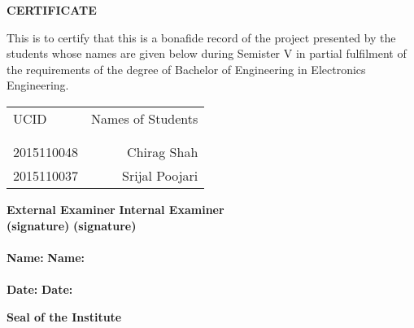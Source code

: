 \newpage
\thispagestyle{empty}
\vspace*{0.2cm}
\vspace{1cm}
\begin{center}
 \large\textbf{CERTIFICATE }
\end{center}%
\vspace{2cm}
This is to certify that this is a bonafide record of the project presented by the students whose names are given below during Semister V in partial fulfilment of the requirements of the degree of Bachelor of Engineering in Electronics Engineering.

\begin{table}[h]
\centering
\begin{tabular}{lr}
UCID & Names of Students \\ \\ \hline
\\
2015110048 &  Chirag Shah \\
2015110037 &  Srijal Poojari \\ 
 \hline 
\end{tabular}
\end{table}

\vspace{2.5cm}
\textbf {External Examiner} \hspace{2.8in} \textbf{Internal Examiner}
\vspace{2cm}\\
\textbf {(signature)} \hspace{3.5in} \textbf{(signature)} \\
\vspace{1cm}\\
\textbf {Name:} \hspace{3in} \textbf{Name:}\\ 
\vspace{1cm}\\
\textbf {Date:} \hspace{3in} \textbf{Date:}\\ 
\vspace{2cm}

\begin{center}
\textbf{Seal of the Institute}\\
\end{center}
\vspace{2cm}
